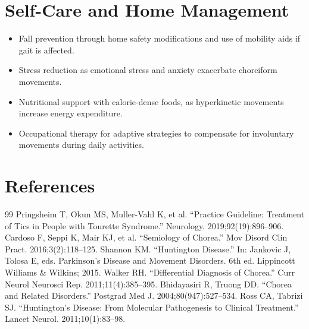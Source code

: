 \section*{Self-Care and Home Management}
\begin{itemize}
  \item Fall prevention through home safety modifications and use of mobility aids if gait is affected.
  \item Stress reduction as emotional stress and anxiety exacerbate choreiform movements.
  \item Nutritional support with calorie-dense foods, as hyperkinetic movements increase energy expenditure.
  \item Occupational therapy for adaptive strategies to compensate for involuntary movements during daily activities.
\end{itemize}

\section*{References}
\begin{thebibliography}{99}
 Pringsheim T, Okun MS, Muller-Vahl K, et al. ``Practice Guideline: Treatment of Tics in People with Tourette Syndrome.'' Neurology. 2019;92(19):896--906.
 Cardoso F, Seppi K, Mair KJ, et al. ``Semiology of Chorea.'' Mov Disord Clin Pract. 2016;3(2):118--125.
 Shannon KM. ``Huntington Disease.'' In: Jankovic J, Tolosa E, eds. Parkinson's Disease and Movement Disorders. 6th ed. Lippincott Williams \& Wilkins; 2015.
 Walker RH. ``Differential Diagnosis of Chorea.'' Curr Neurol Neurosci Rep. 2011;11(4):385--395.
 Bhidayasiri R, Truong DD. ``Chorea and Related Disorders.'' Postgrad Med J. 2004;80(947):527--534.
 Ross CA, Tabrizi SJ. ``Huntington's Disease: From Molecular Pathogenesis to Clinical Treatment.'' Lancet Neurol. 2011;10(1):83--98.
\end{thebibliography}
